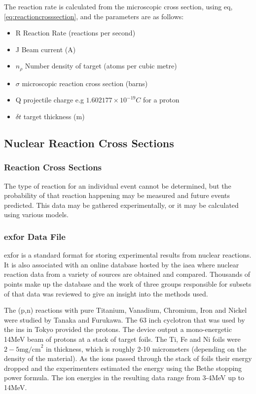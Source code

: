 The reaction rate is calculated from the microscopic cross section, using eq, \ref{eq:reactioncrosssection}, and the parameters are as follows:

\begin{itemize}
\item R	Reaction Rate (reactions per second)
\item J	Beam current (A)
\item $n_{\rho}$	Number density of target (atoms per cubic metre)
\item $\sigma$ microscopic reaction cross section (barns)
\item Q projectile charge e.g $1.602177\times 10^{-19}C$ for a proton 
\item $\delta t$	target thickness (m)
\end{itemize}





\subsection{Nuclear Reaction Cross Sections}
\label{section:nuclearxs}
\subsubsection{Reaction Cross Sections}

The type of reaction for an individual event cannot be determined, but the probability of that reaction happening may be measured and future events predicted.  This data may be gathered experimentally, or it may be calculated using various models.


\FloatBarrier

\subsubsection{\Acrlong{exfor} Data File}
\label{section:exfordata}

\Acrfull{exfor} is a standard format for storing experimental results from nuclear reactions\cite{exforarticle}.  It is also associated with an online database hosted by the \acrfull{iaea} where nuclear reaction data from a variety of sources are obtained and compared. Thousands of points make up the database and the work of three groups responsible for subsets of that data was reviewed to give an insight into the methods used.

The (p,n) reactions with pure Titanium, Vanadium, Chromium, Iron and Nickel were studied by Tanaka and Furukawa\cite{exfortanaka}.  The 63 inch cyclotron that was used by the \acrfull{ins} in Tokyo provided the protons.  The device output a mono-energetic 14MeV beam of protons at a stack of target foils.  The Ti, Fe and Ni foils were $2-5 \text{mg/cm}^{2}$ in thickness, which is roughly 2-10 micrometers (depending on the density of the material).  As the ions passed through the stack of foils their energy dropped and the experimenters estimated the energy using the Bethe stopping power formula\cite{stoppingdistance}.  The ion energies in the resulting data range from 3-4MeV up to 14MeV.

